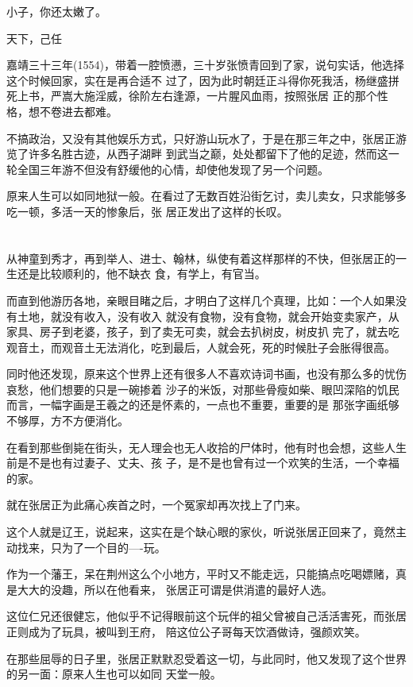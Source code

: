 \documentclass[11pt,a4paper,onecolumn]{article}
\begin{document}
小子，你还太嫩了。

天下，己任

嘉靖三十三年(1554)，带着一腔愤懑，三十岁张愤青回到了家，说句实话，他选择这个时候回家，实在是再合适不
过了，因为此时朝廷正斗得你死我活，杨继盛拼死上书，严嵩大施淫威，徐阶左右逢源，一片腥风血雨，按照张居
正的那个性格，想不卷进去都难。

不搞政治，又没有其他娱乐方式，只好游山玩水了，于是在那三年之中，张居正游览了许多名胜古迹，从西子湖畔
到武当之巅，处处都留下了他的足迹，然而这一轮全国三年游不但没有舒缓他的心情，却使他发现了另一个问题。

原来人生可以如同地狱一般。在看过了无数百姓沿街乞讨，卖儿卖女，只求能够多吃一顿，多活一天的惨象后，张
居正发出了这样的长叹。

\section[\thesection]{}

从神童到秀才，再到举人、进士、翰林，纵使有着这样那样的不快，但张居正的一生还是比较顺利的，他不缺衣
食，有学上，有官当。

而直到他游历各地，亲眼目睹之后，才明白了这样几个真理，比如：一个人如果没有土地，就没有收入，没有收入
就没有食物，没有食物，就会开始变卖家产，从家具、房子到老婆，孩子，到了卖无可卖，就会去扒树皮，树皮扒
完了，就去吃观音土，而观音土无法消化，吃到最后，人就会死，死的时候肚子会胀得很高。

同时他还发现，原来这个世界上还有很多人不喜欢诗词书画，也没有那么多的忧伤哀愁，他们想要的只是一碗掺着
沙子的米饭，对那些骨瘦如柴、眼凹深陷的饥民而言，一幅字画是王羲之的还是怀素的，一点也不重要，重要的是
那张字画纸够不够厚，方不方便消化。

在看到那些倒毙在街头，无人理会也无人收拾的尸体时，他有时也会想，这些人生前是不是也有过妻子、丈夫、孩
子，是不是也曾有过一个欢笑的生活，一个幸福的家。

就在张居正为此痛心疾首之时，一个冤家却再次找上了门来。

这个人就是辽王，说起来，这实在是个缺心眼的家伙，听说张居正回来了，竟然主动找来，只为了一个目的----玩。

作为一个藩王，呆在荆州这么个小地方，平时又不能走远，只能搞点吃喝嫖赌，真是大大的没趣，所以在他看来，
张居正可谓是供消遣的最好人选。

这位仁兄还很健忘，他似乎不记得眼前这个玩伴的祖父曾被自己活活害死，而张居正则成为了玩具，被叫到王府，
陪这位公子哥每天饮酒做诗，强颜欢笑。

在那些屈辱的日子里，张居正默默忍受着这一切，与此同时，他又发现了这个世界的另一面：原来人生也可以如同
天堂一般。
\end{document}
